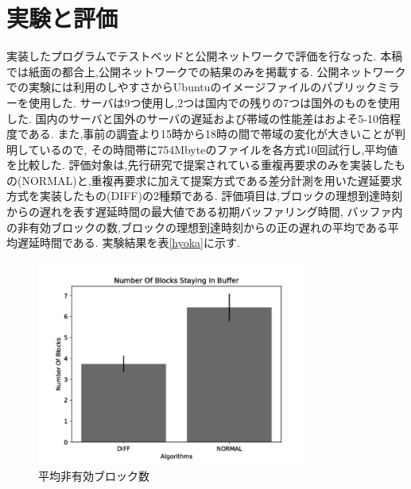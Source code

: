 \documentclass{ltjsarticle}
\begin{document}
\section{実験と評価}
\vspace{-2mm}
実装したプログラムでテストベッドと公開ネットワークで評価を行なった.
本稿では紙面の都合上,公開ネットワークでの結果のみを掲載する.
公開ネットワークでの実験には利用のしやすさからUbuntuのイメージファイルのパブリックミラーを使用した.
サーバは9つ使用し,2つは国内での残りの7つは国外のものを使用した.
国内のサーバと国外のサーバの遅延および帯域の性能差はおよそ5-10倍程度である.
また,事前の調査より15時から18時の間で帯域の変化が大きいことが判明しているので,
その時間帯に754Mbyteのファイルを各方式10回試行し,平均値を比較した.
評価対象は,先行研究で提案されている重複再要求のみを実装したもの(NORMAL)と,重複再要求に加えて提案方式である差分計測を用いた遅延要求方式を実装したもの(DIFF)の2種類である.
評価項目は,ブロックの理想到達時刻からの遅れを表す遅延時間の最大値である初期バッファリング時間,
バッファ内の非有効ブロックの数,ブロックの理想到達時刻からの正の遅れの平均である平均遅延時間である.
実験結果を表\ref{hyoka}に示す.
\vspace{-7mm}
\begin{table}[htb]
	\begin{center}
		\caption{実験結果}
		\label{hyoka}
		\vspace{-3mm}
	\end{center}
\end{table}
\vspace{-15mm}
\begin{figure}[h]
	\centering
	\includegraphics[width=9cm]{figure/nsb-g.pdf}
	\vspace{-9mm}
	\caption{平均非有効ブロック数}
	\label{nsbpub}
\end{figure}
\vspace{-3mm}
\end{document}
